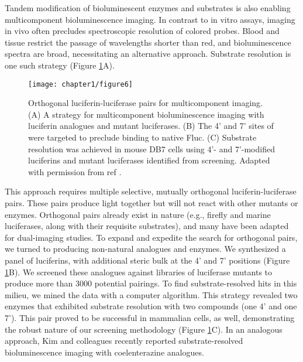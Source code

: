 Tandem modification of bioluminescent enzymes and
substrates is also enabling multicomponent bioluminescence
imaging. In contrast to in vitro assays, imaging in vivo often
precludes spectroscopic resolution of colored probes. Blood
and tissue restrict the passage of wavelengths shorter than red,\cite{Zhao:2005if}
and bioluminescence spectra are broad,\cite{Rumyantsev:2016fd} necessitating an
alternative approach. Substrate resolution is one such strategy
(Figure \ref{fig:jacs_summary}A).

\begin{figure}[htbp]
\texttt{[image: chapter1/figure6]}
\centering
\caption[Orthogonal luciferin-luciferase pairs for multicomponent imaging]{Orthogonal luciferin-luciferase pairs for multicomponent imaging. (A) A strategy for multicomponent bioluminescence imaging with
luciferin analogues and mutant luciferases. (B) The 4' and 7' sites of \dluciferin{} were targeted to preclude binding to native Fluc. (C) Substrate
resolution was achieved in mouse DB7 cells using 4'- and 7'-modified luciferins and mutant luciferases identified from screening. Adapted with
permission from ref \cite{Jones:2017be}.}
  \label{fig:jacs_summary}
\end{figure}

This approach requires multiple selective,
mutually orthogonal luciferin-luciferase pairs. These pairs
produce light together but will not react with other mutants or
enzymes. Orthogonal pairs already exist in nature (e.g., firefly
and marine luciferases, along with their requisite substrates),
and many have been adapted for dual-imaging studies.
To expand and expedite the search for orthogonal pairs, we
turned to producing non-natural analogues and enzymes.\cite{Jones:2017be} We
synthesized a panel of luciferins, with additional steric bulk at
the 4' and 7' positions (Figure \ref{fig:jacs_summary}B). We screened these
analogues against libraries of luciferase mutants to produce
more than 3000 potential pairings. To find substrate-resolved
hits in this milieu, we mined the data with a computer
algorithm. This strategy revealed two enzymes that exhibited
substrate resolution with two compounds (one 4' and one 7').
This pair proved to be successful in mammalian cells, as well,
demonstrating the robust nature of our screening methodology
(Figure \ref{fig:jacs_summary}C). In an analogous approach, Kim and colleagues
recently reported substrate-resolved bioluminescence imaging
with coelenterazine analogues.\cite{Nishihara:2017bd}
